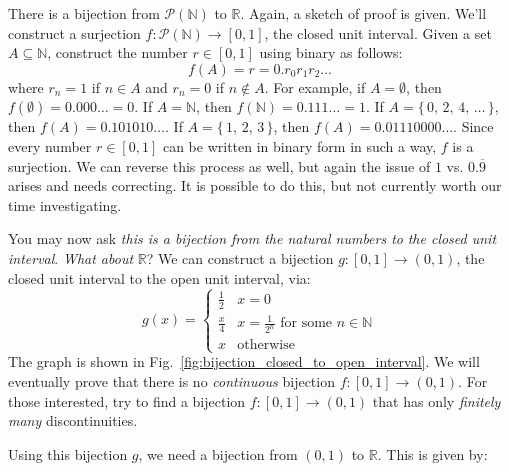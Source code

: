 \documentclass{article}
\theoremstyle{plain}
\theoremstyle{normal}
\begin{document}
        There is a bijection from $\mathcal{P}(\mathbb{N})$ to
        $\mathbb{R}$. Again, a sketch of proof is given. We'll construct a
        surjection $f:\mathcal{P}(\mathbb{N})\rightarrow[0,1]$, the closed
        unit interval. Given a set $A\subseteq\mathbb{N}$, construct the number
        $r\in[0,1]$ using binary as follows:
        \begin{equation}
            f(A)=r=0.r_{0}r_{1}r_{2}\dots
        \end{equation}
        where $r_{n}=1$ if $n\in{A}$ and $r_{n}=0$ if $n\notin{A}$. For
        example, if $A=\emptyset$, then
        $f(\emptyset)=0.000\dots=0$. If $A=\mathbb{N}$, then
        $f(\mathbb{N})=0.111\dots=1$. If $A=\{\,0,\,2,\,4,\,\dots\,\}$, then
        $f(A)=0.101010\dots$. If $A=\{\,1,\,2,\,3\,\}$, then
        $f(A)=0.01110000\dots$. Since every number $r\in[0,1]$ can be written
        in binary form in such a way, $f$ is a surjection. We can reverse this
        process as well, but again the issue of $1$ vs. $0.\overline{9}$ arises
        and needs correcting. It is possible to do this, but not currently worth
        our time investigating.
        \par\hfill\par
        You may now ask \textit{this is a bijection from the natural numbers to}
        \textit{the closed unit interval}. \textit{What about} $\mathbb{R}$?
        We can construct a bijection $g:[0,1]\rightarrow(0,1)$, the closed
        unit interval to the open unit interval, via:
        \begin{equation}
            g(x)=
            \begin{cases}
                \frac{1}{2}&x=0\\
                \frac{x}{4}&x=\frac{1}{2^{n}}\textrm{ for some }n\in\mathbb{N}\\
                x&\textrm{otherwise}
            \end{cases}
        \end{equation}
        The graph is shown in Fig.~\ref{fig:bijection_closed_to_open_interval}.
        We will eventually prove that there is no \textit{continuous} bijection
        $f:[0,1]\rightarrow(0,1)$. For those interested, try to find a
        bijection $f:[0,1]\rightarrow(0,1)$ that has only
        \textit{finitely many} discontinuities.
        \par\hfill\par
        Using this bijection $g$, we need a bijection from $(0,1)$ to
        $\mathbb{R}$. This is given by:
\end{document}
